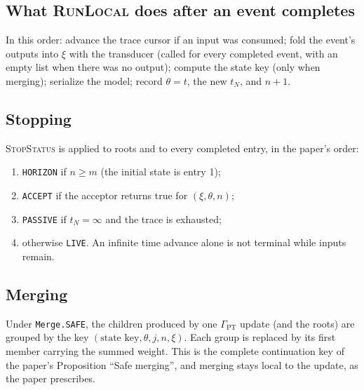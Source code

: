 \documentclass[11pt]{article}
\newcommand{\code}[1]{\texttt{#1}}
\begin{document}
\subsection{What \textsc{RunLocal} does after an event completes}
In this order: advance the trace cursor if an input was consumed; fold the event's outputs into $\xi$ with the
transducer (called for every completed event, with an empty list when there was no output); compute the state key (only
when merging); serialize the model; record $\theta=t$, the new $t_N$, and $n+1$.

\subsection{Stopping}
\textsc{StopStatus} is applied to roots and to every completed entry, in the paper's order:
\begin{enumerate}
\item \code{HORIZON} if $n \ge m$ (the initial state is entry 1);
\item \code{ACCEPT} if the acceptor returns true for $(\xi, \theta, n)$;
\item \code{PASSIVE} if $t_N=\infty$ and the trace is exhausted;
\item otherwise \code{LIVE}. An infinite time advance alone is not terminal while inputs remain.
\end{enumerate}

\subsection{Merging}
Under \code{Merge.SAFE}, the children produced by one $\Gamma_{\mathrm{PT}}$ update (and the roots) are grouped by the key
$(\text{state key}, \theta, j, n, \xi)$. Each group is replaced by its first member carrying the summed weight. This is the
complete continuation key of the paper's Proposition ``Safe merging'', and merging stays local to the update, as the
paper prescribes.
\end{document}
